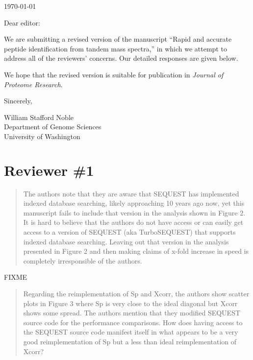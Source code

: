 \documentclass{article}
\newcommand{\breview}{\begin{quotation}\begin{em}\noindent}
\newcommand{\ereview}{\end{em}\end{quotation}}
\begin{document}
\hspace*{3.0in}\today

\vspace*{3ex}

\noindent
Dear editor:

\vspace*{1ex}

We are submitting a revised version of the manuscript ``Rapid and
accurate peptide identification from tandem mass spectra,'' in which
we attempt to address all of the reviewers' concerns.  Our detailed
responses are given below.

We hope that the revised version is suitable for publication in {\em
Journal of Proteome Research}.

\vspace*{1ex}

\noindent
Sincerely,

\hspace*{1ex}

\noindent
William Stafford Noble\\
Department of Genome Sciences\\
University of Washington


\section*{Reviewer \#1}

\breview The authors note that they are aware that SEQUEST has
implemented indexed database searching, likely approaching 10 years
ago now, yet this manuscript fails to include that version in the
analysis shown in Figure 2.  It is hard to believe that the authors do
not have access or can easily get access to a version of SEQUEST (aka
TurboSEQUEST) that supports indexed database searching.  Leaving out
that version in the analysis presented in Figure 2 and then making
claims of x-fold increase in speed is completely irresponsible of the
authors. \ereview

FIXME

\breview Regarding the reimplementation of Sp and Xcorr, the authors
show scatter plots in Figure 3 where Sp is very close to the ideal
diagonal but Xcorr shows some spread.  The authors mention that they
modified SEQUEST source code for the performance comparisons.  How
does having access to the SEQUEST source code manifest itself in what
appears to be a very good reimplementation of Sp but a less than ideal
reimplementation of Xcorr? \ereview
\end{document}
